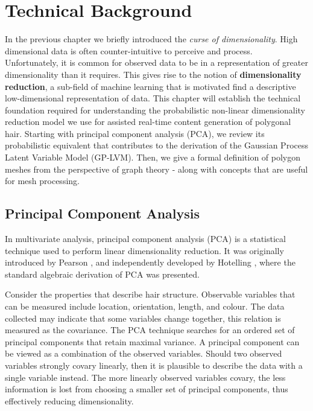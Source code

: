 \documentclass[ %
author={Dillon Keith Diep},
supervisor={Dr. Carl Henrik Ek},
degree={MEng},
title={ART-CG:},
subtitle={Assisted Real-time Content Generation of 3D Hair by Learning Manifolds},
type={Research},
year={2017} ]{dissertation}
\begin{document}

\chapter{Technical Background}
\label{chap:technical}
In the previous chapter we briefly introduced the \textit{curse of dimensionality}. High dimensional data is often counter-intuitive to perceive and process. Unfortunately, it is common for observed data to be in a representation of greater dimensionality than it requires. This gives rise to the notion of \textbf{dimensionality reduction}, a sub-field of machine learning that is motivated find a descriptive low-dimensional representation of data.
This chapter will establish the technical foundation required for understanding the probabilistic non-linear dimensionality reduction model we use for assisted real-time content generation of polygonal hair. Starting with principal component analysis (PCA), we review its probabilistic equivalent that contributes to the derivation of the Gaussian Process Latent Variable Model (GP-LVM). Then, we give a formal definition of polygon meshes from the perspective of graph theory - along with concepts that are useful for mesh processing.

\section{Principal Component Analysis}
In multivariate analysis, principal component analysis (PCA) is a statistical technique used to perform linear dimensionality reduction. It was originally introduced by Pearson \cite{pca1901}, and independently developed by Hotelling \cite{pca1933}, where the standard algebraic derivation of PCA was presented.

Consider the properties that describe hair structure. Observable variables that can be measured include location, orientation, length, and colour. The data collected may indicate that some variables change together, this relation is measured as the covariance. The PCA technique searches for an ordered set of principal components that retain maximal variance. A principal component can be viewed as a combination of the observed variables. Should two observed variables strongly covary linearly, then it is plausible to describe the data with a single variable instead. The more linearly observed variables covary, the less information is lost from choosing a smaller set of principal components, thus effectively reducing dimensionality.
\end{document}
